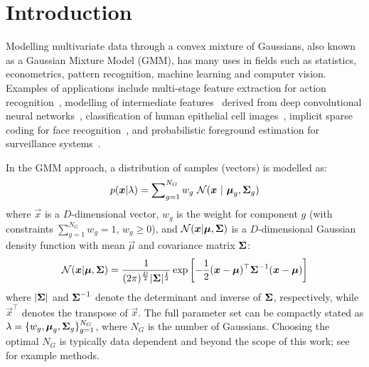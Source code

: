 \section{Introduction}

Modelling multivariate data through a convex mixture of Gaussians, also known as a Gaussian Mixture Model (GMM),
has many uses in fields such as statistics, econometrics, pattern recognition, machine learning and computer vision.
Examples of applications include
multi-stage feature extraction for action recognition~\cite{Carvajal_2016a},
modelling of intermediate features~\cite{Ge_ICIP_2015} derived from deep convolutional neural networks~\cite{Ge_2016,LeCun_Nature_2015},
classification of human epithelial cell images~\cite{Wiliem_PR_2014},
implicit sparse coding for face recognition~\cite{Wong_2014},
and probabilistic foreground estimation for surveillance systems~\cite{Reddy_2013}.

In the GMM approach, a distribution of samples (vectors) is modelled as:
%
\begin{equation}
  p({\boldsymbol{x}} | \lambda) = \sum\nolimits_{g=1}^{N_G} w_g ~ {{\mathcal{N}}}( {\boldsymbol{x}} ~|~ {\boldsymbol{\mu}}_g, {\boldsymbol{\Sigma}}_g )
  \label{eqn:gmm_prob}
\end{equation}%
%
where $\Vec{x}$ is a $D$-dimensional vector,
$w_g$ is the weight for component $g$ (with constraints $\sum\nolimits_{g=1}^{N_G} w_g = 1$, $w_g \geq 0$),
and
${{\mathcal{N}}}( {\boldsymbol{x}} | {\boldsymbol{\mu}}, {\boldsymbol{\Sigma}})$ is a $D$-dimensional Gaussian density function with mean $\Vec{\mu}$ and covariance matrix ${\boldsymbol{\Sigma}}$:
%
\begin{equation}
  {{\mathcal{N}}}( {\boldsymbol{x}} | {\boldsymbol{\mu}}, {\boldsymbol{\Sigma}} )  = 
  \frac{1}{ (2\pi)^{\frac{D}{2}} | {\boldsymbol{\Sigma}}|^{\frac{1}{2}} }
  \exp \left[ -\frac{1}{2} ({\boldsymbol{x}}-{\boldsymbol{\mu}})^\top {\boldsymbol{\Sigma}}^{-1} ({\boldsymbol{x}}-{\boldsymbol{\mu}}) \right]
  \label{eqn:gaussian}
\end{equation}%
%
where $|{\boldsymbol{\Sigma}}|$ and ${\boldsymbol{\Sigma}}^{-1}$ denote the determinant and inverse of ${\boldsymbol{\Sigma}}$, respectively,
while $\Vec{x}^\top$ denotes the transpose of $\Vec{x}$.
The full parameter set can be compactly stated as $\lambda = \{ w_g, {\boldsymbol{\mu}}_g, {\boldsymbol{\Sigma}}_g \}_{g=1}^{N_G}$,
where $N_G$ is the number of Gaussians.
Choosing the optimal $N_G$ is typically data dependent and beyond the scope of this work; see~\cite{Hamerly_2003,Pelleg_2000} for example methods.


